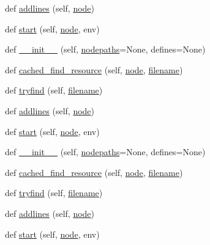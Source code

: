 \begin{DoxyCompactItemize}
\item 
def \hyperlink{classwaflib_1_1_tools_1_1c__preproc_1_1c__parser_a9a0cb675b91f0ce6d65109e1b67bcc69}{addlines} (self, \hyperlink{structnode}{node})
\item 
def \hyperlink{classwaflib_1_1_tools_1_1c__preproc_1_1c__parser_ada08ffe0c9d9fcf8d55b3e35927511e6}{start} (self, \hyperlink{structnode}{node}, env)
\item 
def \hyperlink{classwaflib_1_1_tools_1_1c__preproc_1_1c__parser_aa06a68f192a6f93ba1587fa653d57eaa}{\+\_\+\+\_\+init\+\_\+\+\_\+} (self, \hyperlink{classwaflib_1_1_tools_1_1c__preproc_1_1c__parser_a175b9d997a489166cdfbff084ded4adf}{nodepaths}=None, defines=None)
\item 
def \hyperlink{classwaflib_1_1_tools_1_1c__preproc_1_1c__parser_a05773b7fed7398fc94fb3393dca8b641}{cached\+\_\+find\+\_\+resource} (self, \hyperlink{structnode}{node}, \hyperlink{test__portburn_8cpp_a7efa5e9c7494c7d4586359300221aa5d}{filename})
\item 
def \hyperlink{classwaflib_1_1_tools_1_1c__preproc_1_1c__parser_a7cbdc05f2fac61f5b962f558d18bf7ab}{tryfind} (self, \hyperlink{test__portburn_8cpp_a7efa5e9c7494c7d4586359300221aa5d}{filename})
\item 
def \hyperlink{classwaflib_1_1_tools_1_1c__preproc_1_1c__parser_a9a0cb675b91f0ce6d65109e1b67bcc69}{addlines} (self, \hyperlink{structnode}{node})
\item 
def \hyperlink{classwaflib_1_1_tools_1_1c__preproc_1_1c__parser_ada08ffe0c9d9fcf8d55b3e35927511e6}{start} (self, \hyperlink{structnode}{node}, env)
\item 
def \hyperlink{classwaflib_1_1_tools_1_1c__preproc_1_1c__parser_aa06a68f192a6f93ba1587fa653d57eaa}{\+\_\+\+\_\+init\+\_\+\+\_\+} (self, \hyperlink{classwaflib_1_1_tools_1_1c__preproc_1_1c__parser_a175b9d997a489166cdfbff084ded4adf}{nodepaths}=None, defines=None)
\item 
def \hyperlink{classwaflib_1_1_tools_1_1c__preproc_1_1c__parser_a05773b7fed7398fc94fb3393dca8b641}{cached\+\_\+find\+\_\+resource} (self, \hyperlink{structnode}{node}, \hyperlink{test__portburn_8cpp_a7efa5e9c7494c7d4586359300221aa5d}{filename})
\item 
def \hyperlink{classwaflib_1_1_tools_1_1c__preproc_1_1c__parser_a7cbdc05f2fac61f5b962f558d18bf7ab}{tryfind} (self, \hyperlink{test__portburn_8cpp_a7efa5e9c7494c7d4586359300221aa5d}{filename})
\item 
def \hyperlink{classwaflib_1_1_tools_1_1c__preproc_1_1c__parser_a9a0cb675b91f0ce6d65109e1b67bcc69}{addlines} (self, \hyperlink{structnode}{node})
\item 
def \hyperlink{classwaflib_1_1_tools_1_1c__preproc_1_1c__parser_ada08ffe0c9d9fcf8d55b3e35927511e6}{start} (self, \hyperlink{structnode}{node}, env)
\end{DoxyCompactItemize}
